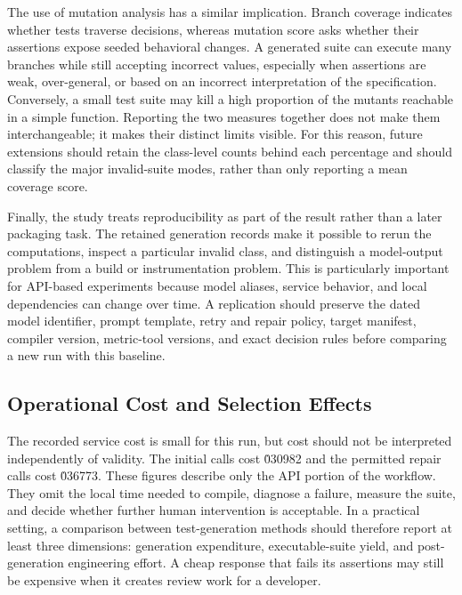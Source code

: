 ﻿\documentclass[conference]{IEEEtran}
\begin{document}
The use of mutation analysis has a similar implication. Branch coverage indicates whether tests traverse decisions, whereas mutation score asks whether their assertions expose seeded behavioral changes. A generated suite can execute many branches while still accepting incorrect values, especially when assertions are weak, over-general, or based on an incorrect interpretation of the specification. Conversely, a small test suite may kill a high proportion of the mutants reachable in a simple function. Reporting the two measures together does not make them interchangeable; it makes their distinct limits visible. For this reason, future extensions should retain the class-level counts behind each percentage and should classify the major invalid-suite modes, rather than only reporting a mean coverage score.

Finally, the study treats reproducibility as part of the result rather than a later packaging task. The retained generation records make it possible to rerun the computations, inspect a particular invalid class, and distinguish a model-output problem from a build or instrumentation problem. This is particularly important for API-based experiments because model aliases, service behavior, and local dependencies can change over time. A replication should preserve the dated model identifier, prompt template, retry and repair policy, target manifest, compiler version, metric-tool versions, and exact decision rules before comparing a new run with this baseline.

\balance
\subsection{Operational Cost and Selection Effects}
The recorded service cost is small for this run, but cost should not be interpreted independently of validity. The initial calls cost \.030982 and the permitted repair calls cost \.036773. These figures describe only the API portion of the workflow. They omit the local time needed to compile, diagnose a failure, measure the suite, and decide whether further human intervention is acceptable. In a practical setting, a comparison between test-generation methods should therefore report at least three dimensions: generation expenditure, executable-suite yield, and post-generation engineering effort. A cheap response that fails its assertions may still be expensive when it creates review work for a developer.
\end{document}
